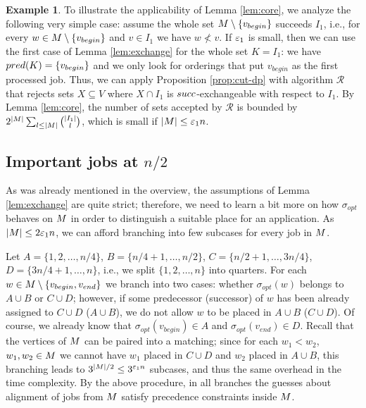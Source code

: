 \documentclass{article}
\theoremstyle{definition}
\newtheorem{example}[theorem]{Example}
\begin{document}
\begin{example}
To illustrate the applicability of Lemma \ref{lem:core}, we analyze the following very simple case:
assume the whole set $M \setminus \{v_{begin}\}$ succeeds $I_1$, i.e., for every $w\in M \setminus \{v_{begin}\}$ and $v\in I_1$ we have $w \not< v$.
If $\varepsilon_1$ is small, then we can use the first case of Lemma \ref{lem:exchange} for the whole set $K=I_1$: we have ${pred}(K) = \{v_{begin}\}$ and we
only look for orderings that put $v_{begin}$ as the first processed job.
Thus, we can apply Proposition \ref{prop:cut-dp} with algorithm $\mathcal{R}$ that rejects sets $X \subseteq V$ where $X \cap I_1$ is ${succ}$-exchangeable with respect to
$I_1$. By Lemma \ref{lem:core}, the number of sets accepted by $\mathcal{R}$ is bounded by $2^{|M|} \sum_{l \leq |M|} \binom{|I_1|}{l}$,
which is small if $|M| \leq \varepsilon_1 n$.
\end{example}

\subsection{Important jobs at $n/2$}\label{sec:half}

As was already mentioned in the overview, the assumptions of Lemma \ref{lem:exchange} are quite strict; therefore, we need to learn a bit more on how $\sigma_{opt}$ behaves on $M$ in order to distinguish a suitable place for an application. As $|M| \leq 2\varepsilon_1 n$, we can afford branching into few subcases for every job in $M$.

Let $A = \{1,2,\ldots,n/4\}$, $B = \{n/4+1, \ldots, n/2\}$, $C = \{n/2+1, \ldots, 3n/4\}$, $D = \{3n/4+1, \ldots, n\}$, i.e., we split $\{1,2,\ldots,n\}$ into quarters.
For each $w \in M\setminus \{v_{begin},v_{end}\}$ we branch into two cases: whether $\sigma_{opt}(w)$ belongs to $A \cup B$ or $C \cup D$;
however, if some predecessor (successor) of $w$ has been already assigned to $C \cup D$ ($A \cup B$), we do not allow $w$ to be placed in $A \cup B$ ($C \cup D$).
Of course, we already know that $\sigma_{opt}(v_{begin})\in A$ and $\sigma_{opt}(v_{end})\in D$.
Recall that the vertices of $M$ can be paired into a matching; since for each $w_1 < w_2$, $w_1,w_2 \in M$ we cannot have $w_1$ placed in $C \cup D$
and $w_2$ placed in $A \cup B$, this branching leads to $3^{|M|/2} \leq 3^{\varepsilon_1 n}$ subcases, and thus the same overhead in the time complexity.
By the above procedure, in all branches the guesses about alignment of jobs from $M$ satisfy precedence constraints inside $M$.
\end{document}
